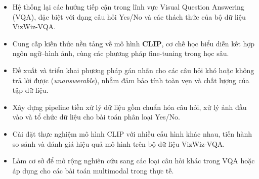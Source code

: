 \begin{itemize}
    \item Hệ thống lại các hướng tiếp cận trong lĩnh vực Visual Question Answering (VQA), đặc biệt với dạng câu hỏi Yes/No và các thách thức của bộ dữ liệu VizWiz-VQA.
    \item Cung cấp kiến thức nền tảng về mô hình \textbf{CLIP}, cơ chế học biểu diễn kết hợp ngôn ngữ--hình ảnh, cùng các phương pháp fine-tuning trong học sâu.
    \item Đề xuất và triển khai phương pháp gán nhãn cho các câu hỏi khó hoặc không trả lời được (\textit{unanswerable}), nhằm đảm bảo tính toàn vẹn và chất lượng của tập dữ liệu.
    \item Xây dựng pipeline tiền xử lý dữ liệu gồm chuẩn hóa câu hỏi, xử lý ảnh đầu vào và tổ chức dữ liệu cho bài toán phân loại Yes/No.
    \item Cài đặt thực nghiệm mô hình CLIP với nhiều cấu hình khác nhau, tiến hành so sánh và đánh giá hiệu quả mô hình trên bộ dữ liệu VizWiz-VQA.
    \item Làm cơ sở để mở rộng nghiên cứu sang các loại câu hỏi khác trong VQA hoặc áp dụng cho các bài toán multimodal trong thực tế.
\end{itemize}






